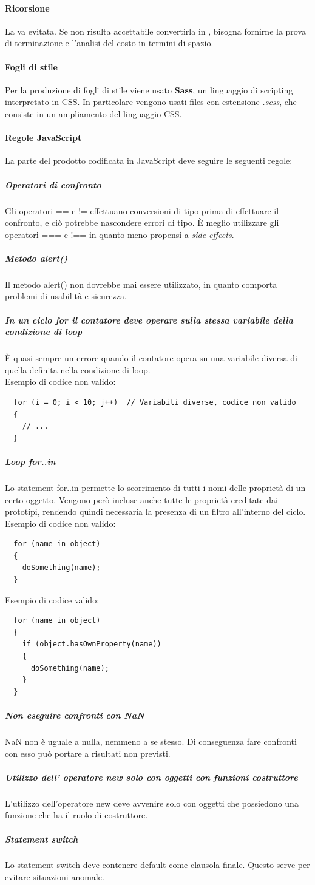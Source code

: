  \paragraph{Ricorsione}
 La  va evitata. Se non risulta accettabile convertirla in , bisogna fornirne la prova di terminazione e l'analisi del costo in termini di spazio.

 \paragraph{Fogli di stile}
 Per la produzione di fogli di stile viene usato \textbf{Sass}, un linguaggio di scripting interpretato in CSS. In particolare vengono usati files con estensione \textit{.scss}, che consiste in un ampliamento del linguaggio CSS.
\paragraph{Regole JavaScript}
La parte del prodotto codificata in JavaScript deve seguire le seguenti regole:
\subparagraph{Operatori di confronto}
Gli operatori == e != effettuano conversioni di tipo prima di effettuare il confronto, e ciò potrebbe nascondere errori di tipo. È meglio utilizzare gli operatori === e !== in quanto meno propensi a \textit{side-effects}.
\subparagraph{Metodo alert()}
Il metodo alert() non dovrebbe mai essere utilizzato, in quanto comporta problemi di usabilità e sicurezza.
\subparagraph{In un ciclo for il contatore deve operare sulla stessa variabile della condizione di loop}
È quasi sempre un errore quando il contatore opera su una variabile diversa di quella definita nella condizione di loop.\\
Esempio di codice non valido:
\begin{verbatim}
  for (i = 0; i < 10; j++)  // Variabili diverse, codice non valido
  {  
    // ...
  }
\end{verbatim}

\subparagraph{Loop for..in}
Lo statement for..in permette lo scorrimento di tutti i nomi delle proprietà di un certo oggetto. Vengono però incluse anche tutte le proprietà ereditate dai prototipi, rendendo quindi necessaria la presenza di un filtro all'interno del ciclo.\\
Esempio di codice non valido:
\begin{verbatim}
  for (name in object) 
  {
    doSomething(name); 
  }
\end{verbatim}
Esempio di codice valido:
\begin{verbatim}
  for (name in object) 
  {
    if (object.hasOwnProperty(name)) 
    {
      doSomething(name);
    }
  }
\end{verbatim}
\subparagraph{Non eseguire confronti con NaN}
NaN non è uguale a nulla, nemmeno a se stesso. Di conseguenza fare confronti con esso può portare a risultati non previsti.
\subparagraph{Utilizzo dell' operatore new solo con oggetti con funzioni costruttore}
L'utilizzo dell'operatore new deve avvenire solo con oggetti che possiedono una funzione che ha il ruolo di costruttore.
\subparagraph{Statement switch}
Lo statement switch deve contenere default come clausola finale. Questo serve per evitare situazioni anomale.

